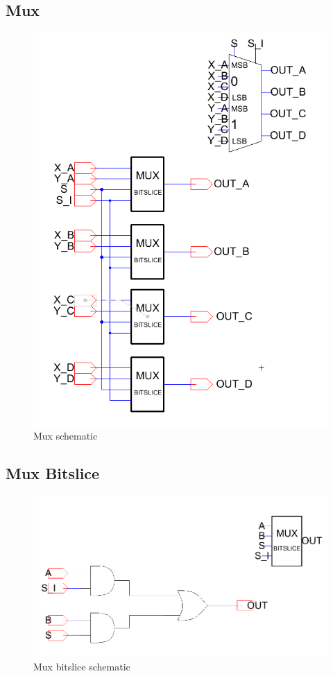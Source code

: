 \documentclass[12pt]{report}
\begin{document}
\subsection*{Mux}
\begin{figure}[H]
  \centering
    \includegraphics[width=1.0\textwidth]{Schematics/mux_schematic.PNG}
  \caption{Mux schematic}
  \label{fig:mux_schematic}
\end{figure}

\subsection*{Mux Bitslice}
\begin{figure}[H]
  \centering
    \includegraphics[width=1.0\textwidth]{Schematics/mux_bitslice_schematic.PNG}
  \caption{Mux bitslice schematic}
  \label{fig:mux_bitslice_schematic}
\end{figure}
\end{document}
